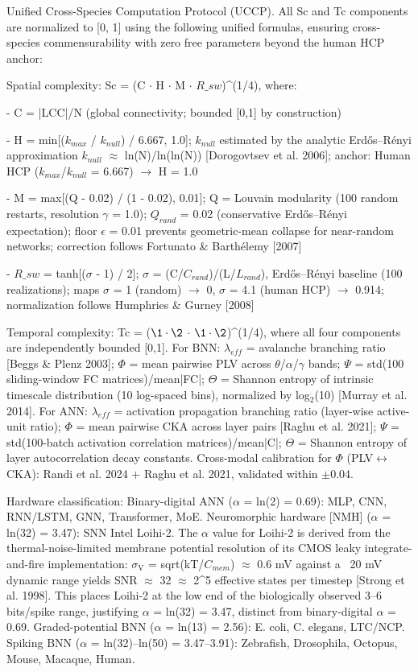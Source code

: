 \documentclass[a4paper,12pt]{article}
\providecommand{\textsubscript}[1]{\ensuremath{_{\text{#1}}}}
\begin{document}
Unified Cross-Species Computation Protocol (UCCP). All Sc and Tc components are normalized to [0, 1] using the following unified formulas, ensuring cross-species commensurability with zero free parameters beyond the human HCP anchor:


Spatial complexity: Sc = (C $\cdot$ H $\cdot$ M $\cdot$ $R\_{sw}$)^(1/4), where:


- C = |LCC|/N (global connectivity; bounded [0,1] by construction)


- H = min[($k_{max}$ / $k_{null}$) / 6.667, 1.0]; $k_{null}$ estimated by the analytic Erd\H{o}s--R\'enyi approximation $k_{null}$ $\approx$ ln(N)/ln(ln(N)) [Dorogovtsev et al. 2006]; anchor: Human HCP ($k_{max}$/$k_{null}$ = 6.667) $\rightarrow$ H = 1.0


- M = max[(Q - 0.02) / (1 - 0.02), 0.01]; Q = Louvain modularity (100 random restarts, resolution $\gamma$ = 1.0); $Q_{rand}$ = 0.02 (conservative Erd\H{o}s--R\'enyi expectation); floor $\epsilon$ = 0.01 prevents geometric-mean collapse for near-random networks; correction follows Fortunato \& Barth\'elemy [2007]


- $R\_{sw}$ = tanh[($\sigma$ - 1) / 2]; $\sigma$ = (C/$C_{rand}$)/(L/$L_{rand}$), Erd\H{o}s--R\'enyi baseline (100 realizations); maps $\sigma$ = 1 (random) $\rightarrow$ 0, $\sigma$ = 4.1 (human HCP) $\rightarrow$ 0.914; normalization follows Humphries \& Gurney [2008]


Temporal complexity: Tc = ($\1 \cdot \2$ $\cdot$ $\1 \cdot \2$)^(1/4), where all four components are independently bounded [0,1].
For BNN: $\lambda_{eff}$ = avalanche branching ratio [Beggs \& Plenz 2003]; $\Phi$ = mean pairwise PLV across $\theta$/$\alpha$/$\gamma$ bands; $\Psi$ = std(100 sliding-window FC matrices)/mean|FC|; $\Theta$ = Shannon entropy of intrinsic timescale distribution (10 log-spaced bins), normalized by log\textsubscript{2}(10) [Murray et al. 2014].
For ANN: $\lambda_{eff}$ = activation propagation branching ratio (layer-wise active-unit ratio); $\Phi$ = mean pairwise CKA across layer pairs [Raghu et al. 2021]; $\Psi$ = std(100-batch activation correlation matrices)/mean|C|; $\Theta$ = Shannon entropy of layer autocorrelation decay constants.
Cross-modal calibration for $\Phi$ (PLV$\leftrightarrow$CKA): Randi et al. 2024 + Raghu et al. 2021, validated within $\pm$0.04.


Hardware classification: Binary-digital ANN ($\alpha$ = ln(2) = 0.69): MLP, CNN, RNN/LSTM, GNN, Transformer, MoE.
Neuromorphic hardware [NMH\dag] ($\alpha$ = ln(32) = 3.47): SNN Intel Loihi-2.
The $\alpha$ value for Loihi-2 is derived from the thermal-noise-limited membrane potential resolution of its CMOS leaky integrate-and-fire implementation: $\sigma_{\text{V}}$ = sqrt(kT/$C_{mem}$) $\approx$ 0.6 mV against a ~20 mV dynamic range yields SNR $\approx$ 32 $\approx$ 2^5 effective states per timestep [Strong et al. 1998].
This places Loihi-2 at the low end of the biologically observed 3--6 bits/spike range, justifying $\alpha$ = ln(32) = 3.47, distinct from binary-digital $\alpha$ = 0.69.
Graded-potential BNN ($\alpha$ = ln(13) = 2.56): E. coli, C. elegans, LTC/NCP.
Spiking BNN ($\alpha$ = ln(32)--ln(50) = 3.47--3.91): Zebrafish, Drosophila, Octopus, Mouse, Macaque, Human.
\end{document}
